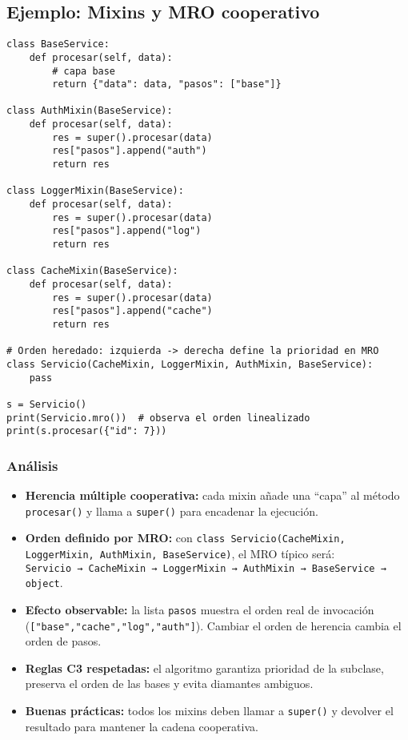 \documentclass[12pt,a4paper]{article}
\begin{document}
\subsection*{Ejemplo: Mixins y MRO cooperativo}
\begin{lstlisting}
class BaseService:
    def procesar(self, data):
        # capa base
        return {"data": data, "pasos": ["base"]}

class AuthMixin(BaseService):
    def procesar(self, data):
        res = super().procesar(data)
        res["pasos"].append("auth")
        return res

class LoggerMixin(BaseService):
    def procesar(self, data):
        res = super().procesar(data)
        res["pasos"].append("log")
        return res

class CacheMixin(BaseService):
    def procesar(self, data):
        res = super().procesar(data)
        res["pasos"].append("cache")
        return res

# Orden heredado: izquierda -> derecha define la prioridad en MRO
class Servicio(CacheMixin, LoggerMixin, AuthMixin, BaseService):
    pass

s = Servicio()
print(Servicio.mro())  # observa el orden linealizado
print(s.procesar({"id": 7}))
\end{lstlisting}

\subsubsection*{Análisis}
\begin{itemize}
    \item \textbf{Herencia múltiple cooperativa:} cada mixin añade una “capa” al método \texttt{procesar()} y llama a \texttt{super()} para encadenar la ejecución.
    \item \textbf{Orden definido por MRO:} con \texttt{class Servicio(CacheMixin, LoggerMixin, AuthMixin, BaseService)}, el MRO típico será: \\
    \texttt{Servicio → CacheMixin → LoggerMixin → AuthMixin → BaseService → object}.
    \item \textbf{Efecto observable:} la lista \texttt{pasos} muestra el orden real de invocación (\texttt{["base","cache","log","auth"]}). Cambiar el orden de herencia cambia el orden de pasos.
    \item \textbf{Reglas C3 respetadas:} el algoritmo garantiza prioridad de la subclase, preserva el orden de las bases y evita diamantes ambiguos.
    \item \textbf{Buenas prácticas:} todos los mixins deben llamar a \texttt{super()} y devolver el resultado para mantener la cadena cooperativa.
\end{itemize}
\end{document}
